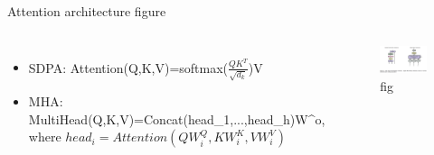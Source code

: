 \begin{frame}{Attention architecture figure}
\begin{columns}

\begin{itemize}
\item SDPA: Attention(Q,K,V)=softmax($\frac{QK^{T}}{\sqrt{d_k}}$)V
\item MHA: MultiHead(Q,K,V)=Concat(head_1,...,head_h)W^o, where $head_i=Attention(QW_{i}^{Q},KW_{i}^{K},VW_{i}^{V})$
\end{itemize}

\begin{figure}[!h]
\includegraphics[width=\textwidth]{assets/attention-fig.png}
\caption{fig}
\end{figure}

\end{columns}
\end{frame}

